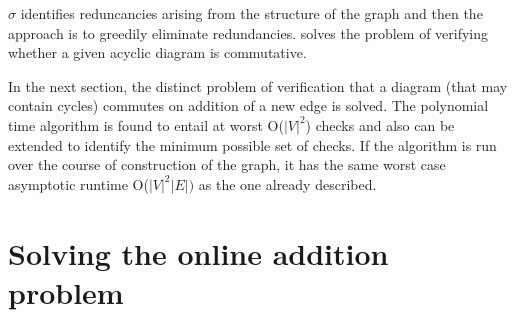 \documentclass{article}
\begin{document}
$\sigma$ identifies reduncancies arising from the structure of the graph and then the approach is to greedily eliminate redundancies.
\cite{commutative} solves the problem of verifying whether a given acyclic diagram is commutative.

In the next section, the distinct problem of verification that a diagram (that may contain cycles) commutes on addition of a new edge is solved. The polynomial time algorithm is found to entail at worst O($|V|^2$) checks and also can be extended to identify the minimum possible set of checks. If the algorithm is run over the course of construction of the graph, it has the same worst case asymptotic runtime O($|V|^2|E|)$ as the one already described.

\section{Solving the online addition problem}
\end{document}
